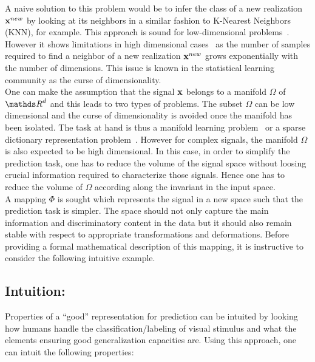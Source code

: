 \documentclass[a4paper,11pt]{report}
\begin{document}
		A naive solution to this problem would be to infer the class of a new realization ${\bf x}^{new}$ by looking at its neighbors in a similar fashion to K-Nearest Neighbors (KNN), for example. This approach is sound for low-dimensional problems~\citep{cover1967nearest}. However it shows limitations in high dimensional cases~\citep{beyer1999nearest} as the number of samples required to find a neighbor of a new realization ${\bf x}^{new}$ grows exponentially with the number of dimensions. This issue is known in the statistical learning community as the curse of dimensionality.\\
			
		One can make the assumption that the signal ${\bf x}$ belongs to a manifold $\Omega$ of $\dsR^{d}$ and this leads to two types of problems. The subset $\Omega$ can be low dimensional and the curse of dimensionality is avoided once the manifold has been isolated. The task at hand is thus a manifold learning problem~\citep{lin2008riemannian} \citep{zhang2012adaptive} or a sparse dictionary representation problem~\citep{kreutz2003dictionary}. However for complex signals, the manifold $\Omega$ is also expected to be high dimensional. In this case, in order to simplify the prediction task, one has to reduce the volume of the signal space without loosing crucial information required to characterize those signals. Hence one has to reduce the volume of $\Omega$ according along the invariant in the input space.\\
		
		A mapping $\Phi$ is sought which represents the signal in a new space such that the prediction task is simpler. The space should not only capture the main information and discriminatory content in the data but it should also remain stable with respect to appropriate transformations and deformations. Before providing a formal mathematical description of this mapping, it is instructive to consider the following intuitive example.
    
		\subsection{Intuition:}
      \label{sec:Intro/Signal rep/Intuition}
      
      Properties of a ``good'' representation for prediction can be intuited by looking how humans handle the classification/labeling of visual stimulus and what the elements ensuring good generalization capacities are. Using this approach, one can intuit the following properties:\\
            
\end{document}
